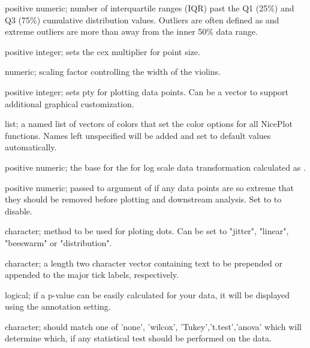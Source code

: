 \documentclass[a4paper]{book}
\begin{document}
\begin{Arguments}
\begin{ldescription}
\item[\code{outliers}] positive numeric; number of interquartile ranges (IQR) past the Q1 (25\%) and Q3 (75\%) cumulative distribution values. Outliers are often defined as  and extreme outliers are more than  away from the inner 50\% data range.

\item[\code{pointSize}] positive integer; sets the cex multiplier for point size.

\item[\code{width}] numeric; scaling factor controlling the width of the violins.

\item[\code{pointShape}] positive integer; sets pty for plotting data points. Can be a vector to support additional graphical customization.

\item[\code{plotColors}] list; a named list of vectors of colors that set the color options for all NicePlot functions. Names left unspecified will be added and set to default values automatically.

\item[\code{logScale}] positive numeric; the base for the for log scale data transformation calculated as .

\item[\code{trim}] positive numeric; passed to  argument of  if any data points are so extreme that they should be removed before plotting and downstream analysis. Set to  to disable.

\item[\code{pointMethod}] character; method to be used for ploting dots. Can be set to "jitter", "linear", "beeswarm" or "distribution".

\item[\code{axisText}] character; a length two character vector containing text to be prepended or appended to the major tick labels, respectively.

\item[\code{showCalc}] logical; if a p-value can be easily calculated for your data, it will be displayed using the  annotation setting.

\item[\code{calcType}] character; should match one of 'none', 'wilcox', 'Tukey','t.test','anova' which will determine which, if any statistical test should be performed on the data.


\end{ldescription}
\end{Arguments}
\end{document}
